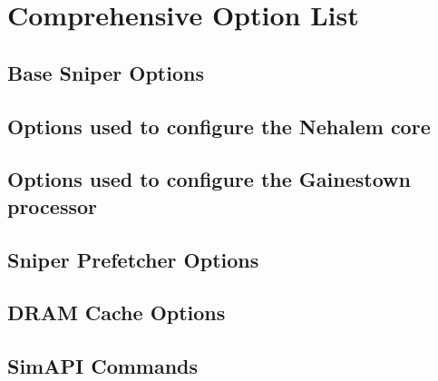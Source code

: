 \documentclass[a4paper,11pt,titlepage]{article}
\begin{document}
\section{Comprehensive Option List}

\subsection{Base Sniper Options}


\subsection{Options used to configure the Nehalem core}


\subsection{Options used to configure the Gainestown processor}


\subsection{Sniper Prefetcher Options}


\subsection{DRAM Cache Options}



\subsection{SimAPI Commands}
\label{sec:option-simapi}



\end{document}
